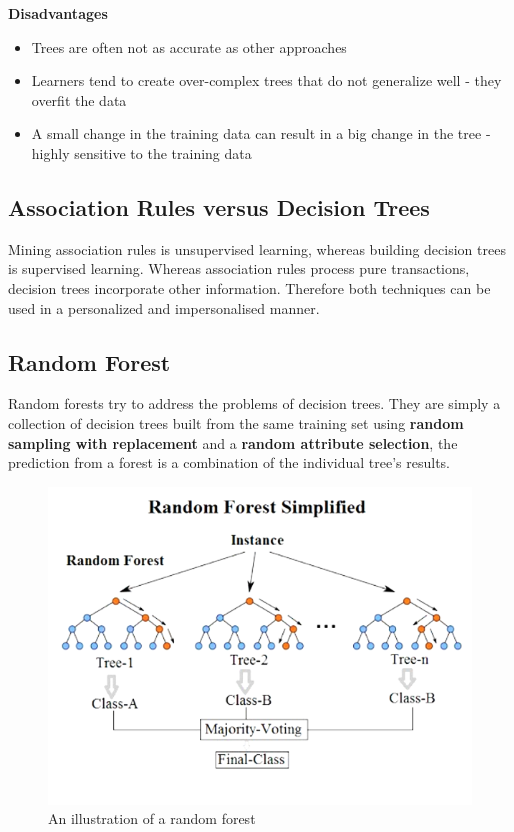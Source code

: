 \documentclass[11pt]{article}
\begin{document}
\noindent
\textbf{Disadvantages}
\begin{itemize}
    \item Trees are often not as accurate as other approaches
    \item Learners tend to create over-complex trees that do not generalize well - they overfit the data
    \item A small change in the training data can result in a big change in the tree - highly sensitive to the training data
\end{itemize}

\subsection{Association Rules versus Decision Trees}

Mining association rules is unsupervised learning, whereas building decision trees is supervised learning. Whereas association rules process pure transactions, decision trees incorporate other information. Therefore both techniques can be used in a personalized and impersonalised manner.

\subsection{Random Forest}

Random forests try to address the problems of decision trees. They are simply a collection of decision trees built from the same training set using \textbf{random sampling with replacement} and a \textbf{random attribute selection}, the prediction from a forest is a combination of the individual tree's results.

\begin{figure}[tbh!]
    \centering
    \includegraphics[width=0.7\linewidth, keepaspectratio]{random_forest_diagram}
    \caption{An illustration of a random forest}
    \label{fig:randomforest}
\end{figure}
\end{document}
